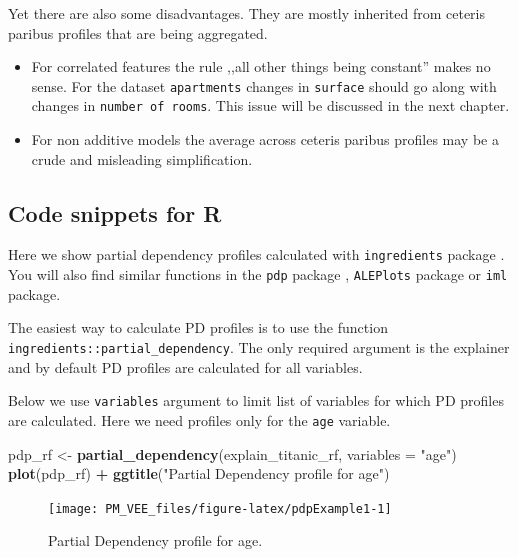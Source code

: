 \documentclass[12pt,]{krantz}
\newenvironment{Shaded}{\begin{snugshade}}{\end{snugshade}}
\newcommand{\DataTypeTok}[1]{\textcolor[rgb]{0.13,0.29,0.53}{#1}}
\newcommand{\KeywordTok}[1]{\textcolor[rgb]{0.13,0.29,0.53}{\textbf{#1}}}
\newcommand{\NormalTok}[1]{#1}
\newcommand{\OperatorTok}[1]{\textcolor[rgb]{0.81,0.36,0.00}{\textbf{#1}}}
\newcommand{\StringTok}[1]{\textcolor[rgb]{0.31,0.60,0.02}{#1}}
\providecommand{\tightlist}{%
  \setlength{\itemsep}{0pt}\setlength{\parskip}{0pt}}
\begin{document}
Yet there are also some disadvantages. They are mostly inherited from ceteris paribus profiles that are being aggregated.

\begin{itemize}
\tightlist
\item
  For correlated features the rule ,,all other things being constant'' makes no sense. For the dataset \texttt{apartments} changes in \texttt{surface} should go along with changes in \texttt{number\ of\ rooms}. This issue will be discussed in the next chapter.
\item
  For non additive models the average across ceteris paribus profiles may be a crude and misleading simplification.
\end{itemize}

\hypertarget{PDPR}{%
\subsection{Code snippets for R}\label{PDPR}}

Here we show partial dependency profiles calculated with \texttt{ingredients} package \citep{ingredientsRPackage}. You will also find similar functions in the \texttt{pdp} package \citep{pdpRPackage}, \texttt{ALEPlots} package \citep{ALEPlotRPackage} or \texttt{iml} \citep{imlRPackage} package.

The easiest way to calculate PD profiles is to use the function \texttt{ingredients::partial\_dependency}.
The only required argument is the explainer and by default PD profiles are calculated for all variables.

Below we use \texttt{variables} argument to limit list of variables for which PD profiles are calculated. Here we need profiles only for the \texttt{age} variable.

\begin{Shaded}
\begin{Highlighting}[]
\NormalTok{pdp_rf <-}\StringTok{ }\KeywordTok{partial_dependency}\NormalTok{(explain_titanic_rf, }\DataTypeTok{variables =} \StringTok{"age"}\NormalTok{)}
\KeywordTok{plot}\NormalTok{(pdp_rf) }\OperatorTok{+}
\StringTok{  }\KeywordTok{ggtitle}\NormalTok{(}\StringTok{"Partial Dependency profile for age"}\NormalTok{) }
\end{Highlighting}
\end{Shaded}

\begin{figure}

{\centering \texttt{[image: PM\_VEE\_files/figure-latex/pdpExample1-1]} 

}

\caption{Partial Dependency profile for age.}\label{fig:pdpExample1}
\end{figure}
\end{document}

